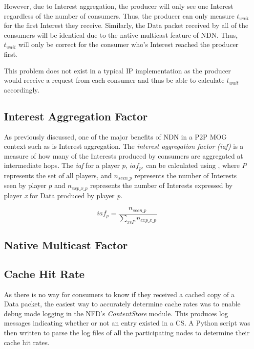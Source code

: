 However, due to Interest aggregation, the producer will only see one Interest regardless of the number of consumers. Thus, the producer can only measure $t_{wait}$ for the first Interest they receive. Similarly, the Data packet received by all of the consumers will be identical due to the native multicast feature of NDN. Thus, $t_{wait}$ will only be correct for the consumer who's Interest reached the producer first.

This problem does not exist in a typical IP implementation as the producer would receive a request from each consumer and thus be able to calculate $t_{wait}$ accordingly. 


\subsection{Interest Aggregation Factor}
As previously discussed, one of the major benefits of NDN in a P2P MOG context such as \game{} is Interest aggregation. The \textit{interest aggregation factor (iaf)} is a measure of how many of the Interests produced by consumers are aggregated at intermediate hops. The \textit{iaf} for a player $p$, $iaf_p$, can be calculated using , where $P$ represents the set of all players, and $n_{seen\_p}$ represents the number of Interests seen by player $p$ and $n_{exp\_x\_p}$ represents the number of Interests expressed by player \textit{x} for Data produced by player \textit{p}.

\begin{equation}\label{eq:impl:iaf}
    iaf_p = \frac{n_{seen\_p}}{\sum\limits_{x \epsilon P}^{}{n_{exp\_x\_p}}}
\end{equation}

\subsection{Native Multicast Factor}

\subsection{Cache Hit Rate}
As there is no way for consumers to know if they received a cached copy of a Data packet, the easiest way to accurately determine cache rates was to enable debug mode logging in the NFD's \textit{ContentStore} module. This produces log messages indicating whether or not an entry existed in a CS. A Python script was then written to parse the log files of all the participating nodes to determine their cache hit rates.

